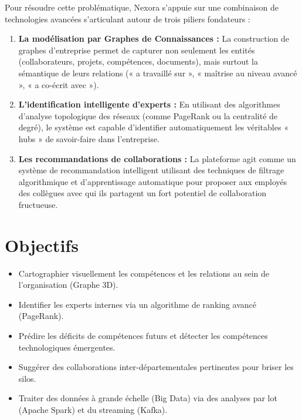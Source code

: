 \documentclass[12pt,a4paper]{article}
\begin{document}
Pour résoudre cette problématique, Nexora s'appuie sur une combinaison de technologies avancées s'articulant autour de trois piliers fondateurs :
\begin{enumerate}
    \item \textbf{La modélisation par Graphes de Connaissances :} La construction de graphes d'entreprise permet de capturer non seulement les entités (collaborateurs, projets, compétences, documents), mais surtout la sémantique de leurs relations (« a travaillé sur », « maîtrise au niveau avancé », « a co-écrit avec »).
    \item \textbf{L'identification intelligente d'experts :} En utilisant des algorithmes d'analyse topologique des réseaux (comme PageRank ou la centralité de degré), le système est capable d'identifier automatiquement les véritables « hubs » de savoir-faire dans l'entreprise.
    \item \textbf{Les recommandations de collaborations :} La plateforme agit comme un système de recommandation intelligent utilisant des techniques de filtrage algorithmique et d'apprentissage automatique pour proposer aux employés des collègues avec qui ils partagent un fort potentiel de collaboration fructueuse.
\end{enumerate}

\section{Objectifs}

\begin{itemize}[leftmargin=*]
    \item Cartographier visuellement les compétences et les relations au sein de l'organisation (Graphe 3D).
    \item Identifier les experts internes via un algorithme de ranking avancé (PageRank).
    \item Prédire les déficits de compétences futurs et détecter les compétences technologiques émergentes.
    \item Suggérer des collaborations inter-départementales pertinentes pour briser les silos.
    \item Traiter des données à grande échelle (Big Data) via des analyses par lot (Apache Spark) et du streaming (Kafka).
\end{itemize}

\end{document}
